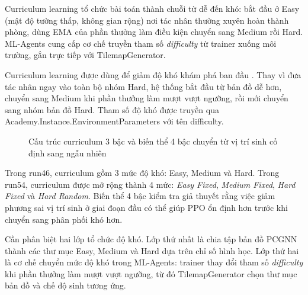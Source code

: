 Curriculum learning tổ chức bài toán thành chuỗi từ dễ đến khó: bắt đầu ở Easy (mật độ tường thấp, không gian rộng) nơi tác nhân thường xuyên hoàn thành phòng, dùng EMA của phần thưởng làm điều kiện chuyển sang Medium rồi Hard. ML-Agents cung cấp cơ chế truyền tham số \emph{difficulty} từ trainer xuống môi trường, gắn trực tiếp với TilemapGenerator.

Curriculum learning được dùng để giảm độ khó khám phá ban đầu \cite{Bengio2009}. Thay vì đưa tác nhân ngay vào toàn bộ nhóm Hard, hệ thống bắt đầu từ bản đồ dễ hơn, chuyển sang Medium khi phần thưởng làm mượt vượt ngưỡng, rồi mới chuyển sang nhóm bản đồ Hard. Tham số độ khó được truyền qua Academy.Instance.EnvironmentParameters với tên difficulty.

\begin{figure}[H]
    \centering
    \caption{Cấu trúc curriculum 3 bậc và biến thể 4 bậc chuyển từ vị trí sinh cố định sang ngẫu nhiên}
    \label{fig:curriculum_structure}
\end{figure}

Trong run46, curriculum gồm 3 mức độ khó: Easy, Medium và Hard. Trong run54, curriculum được mở rộng thành 4 mức: \emph{Easy Fixed}, \emph{Medium Fixed}, \emph{Hard Fixed} và \emph{Hard Random}. Biến thể 4 bậc kiểm tra giả thuyết rằng việc giảm phương sai vị trí sinh ở giai đoạn đầu có thể giúp PPO ổn định hơn trước khi chuyển sang phân phối khó hơn.

Cần phân biệt hai lớp tổ chức độ khó. Lớp thứ nhất là chia tập bản đồ PCGNN thành các thư mục Easy, Medium và Hard dựa trên chỉ số hình học. Lớp thứ hai là cơ chế chuyển mức độ khó trong ML-Agents: trainer thay đổi tham số \emph{difficulty} khi phần thưởng làm mượt vượt ngưỡng, từ đó TilemapGenerator chọn thư mục bản đồ và chế độ sinh tương ứng.

